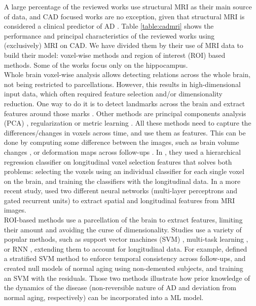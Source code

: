 A large percentage of the reviewed works use structural MRI as their main source of data, and CAD focused works are no exception, given that structural MRI is considered a clinical predictor of AD \cite{Adaszewski2013}. Table \ref{table:cadmri} shows the performance and principal characteristics of the reviewed works using (exclusively) MRI on CAD. We have divided them by their use of MRI data to build their model: voxel-wise methods and region of interest (ROI) based methods. Some of the works focus only on the hippocampus. \\ 

Whole brain voxel-wise analysis allows detecting relations across the whole brain, not being restricted to parcellations. However, this results in high-dimensional input data, which often required feature selection and/or dimensionality reduction. One way to do it is to detect landmarks across the brain and extract features around those marks \cite{Farzan2015,Zhang2017a}. Other methods are principal components analysis (PCA) \cite{Aksman2016,Farzan2015,Sun2017}, regularization \cite{Ortiz2017} or metric learning \cite{Shi2015}. All these methods need to capture the differences/changes in voxels across time, and use them as features. This can be done by computing some difference between the images, such as brain volume changes \cite{Farzan2015}, or deformation maps across follow-ups \cite{Davatzikos2009,Misra2009,Sun2017}. In \cite{Huang2016b}, they used a hierarchical regression classifier on longitudinal voxel selection features that solves both problems: selecting the voxels using an individual classifier for each single voxel on the brain, and training the classifiers with the longitudinal data. In a more recent study, \cite{Cui2018} used two different neural networks (multi-layer perceptrons and gated recurrent units) to extract spatial and longitudinal features from MRI images. \\ 

ROI-based methods use a parcellation of the brain to extract features, limiting their amount and avoiding the curse of dimensionality. Studies use a variety of popular methods, such as support vector machines (SVM) \cite{Gavidia-Bovadilla2017,Guan2017,Li2012,Zhu2016a}, multi-task learning \cite{Liu2013}, or RNN \cite{Ghazi2019}, extending them to account for longitudinal data. For example, \cite{Zhu2016a} defined a stratified SVM method to enforce temporal consistency across follow-ups, and \cite{Gavidia-Bovadilla2017} created null models of normal aging using non-demented subjects, and training an SVM with the residuals. Those two methods illustrate how prior knowledge of the dynamics of the disease (non-reversible nature of AD and deviation from normal aging, respectively) can be incorporated into a ML model. \\

